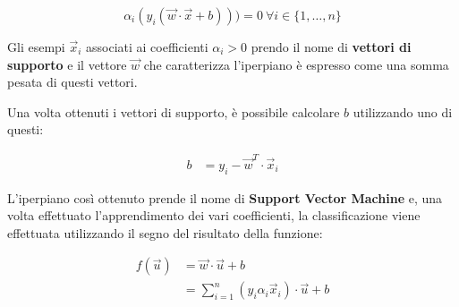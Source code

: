 $$ \alpha_i (y_i (\vec{w}\cdot\vec{x} + b))) = 0 \: \forall i \in \{1, \ldots, n\}$$

Gli esempi $\vec{x}_i$ associati ai coefficienti $\alpha_i > 0$ prendo il nome di \textbf{vettori di supporto} e il vettore $\vec{w}$ che caratterizza l'iperpiano è espresso come una somma pesata di questi vettori.

Una volta ottenuti i vettori di supporto, è possibile calcolare $b$ utilizzando uno di questi:

\begin{align*}
b &= y_i - \vec{w}^T \cdot \vec{x}_i
\end{align*}

L'iperpiano così ottenuto prende il nome di \textbf{Support Vector Machine} e, una volta effettuato l'apprendimento dei vari coefficienti, la classificazione viene effettuata utilizzando il segno del risultato della funzione:

\begin{align*}
f(\vec{u}) &= \vec{w} \cdot \vec{u} + b \\
	  &= \sum\limits_{i = 1}^n (y_i  \alpha_i  \vec{x}_i ) \cdot \vec{u} + b
\end{align*}

